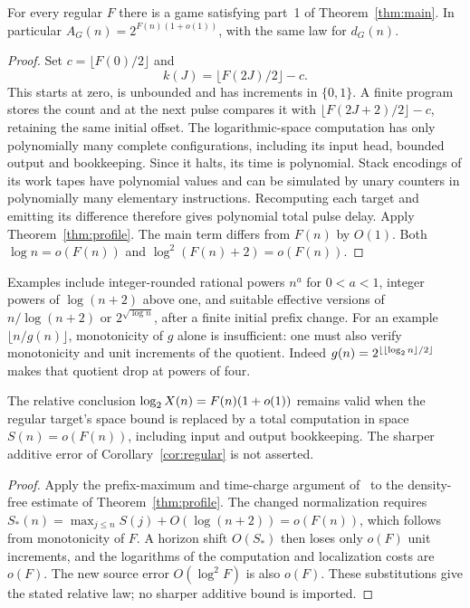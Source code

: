 \begin{corollary}\label{cor:regular}
For every regular $F$ there is a game satisfying part~1 of Theorem~\ref{thm:main}. In particular $A_G(n)=2^{F(n)(1+o(1))}$, with the same law for $d_G(n)$.
\end{corollary}
\begin{proof}
Set $c=\lfloor F(0)/2\rfloor$ and
\[
 k(J)=\lfloor F(2J)/2\rfloor-c.
\]
This starts at zero, is unbounded and has increments in $\{0,1\}$. A finite program stores the count and at the next pulse compares it with $\lfloor F(2J+2)/2\rfloor-c$, retaining the same initial offset. The logarithmic-space computation has only polynomially many complete configurations, including its input head, bounded output and bookkeeping. Since it halts, its time is polynomial. Stack encodings of its work tapes have polynomial values and can be simulated by unary counters in polynomially many elementary instructions. Recomputing each target and emitting its difference therefore gives polynomial total pulse delay. Apply Theorem~\ref{thm:profile}. The main term differs from $F(n)$ by $O(1)$. Both $\log n=o(F(n))$ and $\log^2(F(n)+2)=o(F(n))$.
\end{proof}

Examples include integer-rounded rational powers $n^a$ for $0<a<1$, integer powers of $\log(n+2)$ above one, and suitable effective versions of $n/\log(n+2)$ or $2^{\sqrt{\log n}}$, after a finite initial prefix change. For an example $\lfloor n/g(n)\rfloor$, monotonicity of $g$ alone is insufficient: one must also verify monotonicity and unit increments of the quotient. Indeed $g(n)=2^{\lfloor\lfloor\log_2 n\rfloor/2\rfloor}$ makes that quotient drop at powers of four.

\begin{corollary}\label{cor:space}
The relative conclusion $\log_2 X(n)=F(n)(1+o(1))$ remains valid when the regular target's space bound is replaced by a total computation in space $S(n)=o(F(n))$, including input and output bookkeeping. The sharper additive error of Corollary~\ref{cor:regular} is not asserted.
\end{corollary}
\begin{proof}
Apply the prefix-maximum and time-charge argument of~\cite[Corollary Q5.1]{UP} to the density-free estimate of Theorem~\ref{thm:profile}. The changed normalization requires $S_*(n)=\max_{j\le n}S(j)+O(\log(n+2))=o(F(n))$, which follows from monotonicity of $F$. A horizon shift $O(S_*)$ then loses only $o(F)$ unit increments, and the logarithms of the computation and localization costs are $o(F)$. The new source error $O(\log^2 F)$ is also $o(F)$. These substitutions give the stated relative law; no sharper additive bound is imported.
\end{proof}

